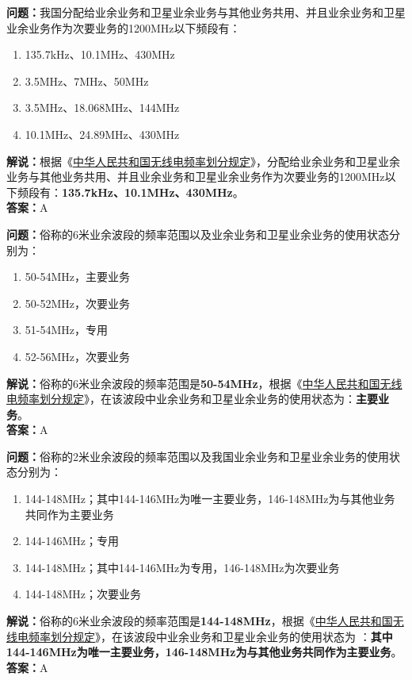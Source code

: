 \textbf{问题：}我国分配给业余业务和卫星业余业务与其他业务共用、并且业余业务和卫星业余业务作为次要业务的1200MHz以下频段有：
\begin{enumerate}[label=\Alph*), leftmargin=1cm]
  \item 135.7kHz、10.1MHz、430MHz
  \item 3.5MHz、7MHz、50MHz
  \item 3.5MHz、18.068MHz、144MHz
  \item 10.1MHz、24.89MHz、430MHz
\end{enumerate}
\textbf{解说：}根据《\href{https://www.miit.gov.cn/zwgk/zcwj/wjfb/txy/art/2020/art_066386284cd2449493586c81ccafed11.html}{中华人民共和国无线电频率划分规定}》，分配给业余业务和卫星业余业务与其他业务共用、并且业余业务和卫星业余业务作为次要业务的1200MHz以下频段有：\textbf{135.7kHz、10.1MHz、430MHz}。\\\textbf{答案：}A%

\textbf{问题：}俗称的6米业余波段的频率范围以及业余业务和卫星业余业务的使用状态分别为：
\begin{enumerate}[label=\Alph*), leftmargin=1cm]
  \item 50-54MHz，主要业务
  \item 50-52MHz，次要业务
  \item 51-54MHz，专用
  \item 52-56MHz，次要业务
\end{enumerate}
\textbf{解说：}俗称的6米业余波段的频率范围是\textbf{50-54MHz}，根据《\href{https://www.miit.gov.cn/zwgk/zcwj/wjfb/txy/art/2020/art_066386284cd2449493586c81ccafed11.html}{中华人民共和国无线电频率划分规定}》，在该波段中业余业务和卫星业余业务的使用状态为：\textbf{主要业务}。\\\textbf{答案：}A

\textbf{问题：}俗称的2米业余波段的频率范围以及我国业余业务和卫星业余业务的使用状态分别为：
\begin{enumerate}[label=\Alph*), leftmargin=1cm]
  \item 144-148MHz；其中144-146MHz为唯一主要业务，146-148MHz为与其他业务共同作为主要业务
  \item 144-146MHz；专用
  \item 144-148MHz；其中144-146MHz为专用，146-148MHz为次要业务
  \item 144-148MHz；次要业务
\end{enumerate}
\textbf{解说：}俗称的6米业余波段的频率范围是\textbf{144-148MHz}，根据《\href{https://www.miit.gov.cn/zwgk/zcwj/wjfb/txy/art/2020/art_066386284cd2449493586c81ccafed11.html}{中华人民共和国无线电频率划分规定}》，在该波段中业余业务和卫星业余业务的使用状态为 ：\textbf{其中144-146MHz为唯一主要业务，146-148MHz为与其他业务共同作为主要业务}。\\\textbf{答案：}A

